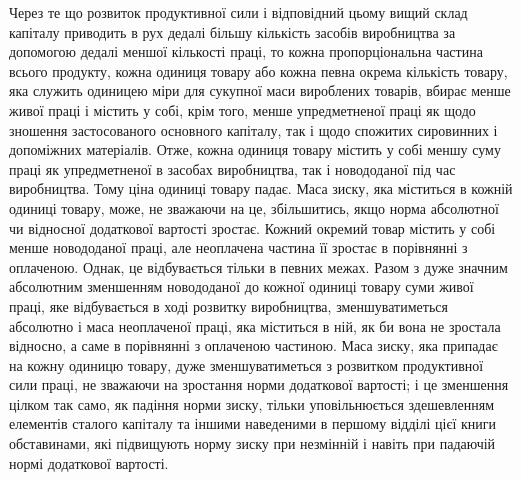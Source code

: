 Через те що розвиток продуктивної сили і відповідний цьому вищий склад капіталу приводить в рух
дедалі більшу кількість засобів виробництва за допомогою дедалі меншої кількості праці, то кожна
пропорціональна частина всього продукту, кожна одиниця товару або кожна певна окрема кількість
товару, яка служить одиницею міри для сукупної маси вироблених товарів, вбирає менше живої праці і
містить у собі, крім того, менше упредметненої праці як щодо зношення застосованого основного
капіталу,
так і щодо спожитих сировинних і допоміжних матеріалів. Отже, кожна одиниця товару містить у собі
меншу суму праці як упредметненої
в засобах виробництва, так і новододаної під час виробництва. Тому ціна одиниці товару
падає. Маса зиску, яка міститься в кожній одиниці товару, може, не зважаючи на це, збільшитись, якщо
норма абсолютної чи відносної додаткової вартості зростає. Кожний окремий товар містить у собі менше
новододаної праці, але неоплачена частина її зростає в порівнянні з оплаченою. Однак, це
відбувається тільки в певних межах. Разом з дуже значним абсолютним зменшенням новододаної до кожної
одиниці товару суми живої праці, яке відбувається в ході розвитку виробництва, зменшуватиметься
абсолютно і маса неоплаченої праці, яка міститься в ній, як би вона не зростала відносно, а саме в
порівнянні з оплаченою частиною. Маса зиску, яка припадає на кожну одиницю товару, дуже
зменшуватиметься з розвитком продуктивної сили праці, не зважаючи на зростання норми додаткової
вартості; і це зменшення цілком так само, як падіння норми зиску, тільки уповільнюється здешевленням
елементів сталого капіталу та іншими наведеними в першому відділі цієї книги обставинами, які
підвищують норму зиску при незмінній і навіть при падаючій нормі додаткової вартості.

